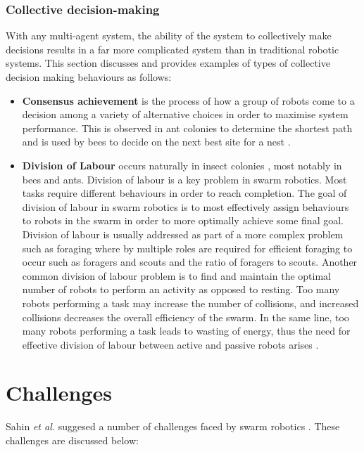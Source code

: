 \subsubsection{Collective decision-making}
With any multi-agent system, the ability of the system to collectively make decisions results in a far more complicated system than in traditional robotic systems. This section discusses and provides examples of types of collective decision making behaviours as follows: 

\begin{itemize}
	\item \textbf{Consensus achievement} is the process of how a group of robots come to a decision among a variety of alternative choices in order to maximise system performance. This is observed in ant colonies to determine the shortest path \cite{bonabeau2001self} and is used by bees to decide on the next best site for a nest \cite{seeley2001nest}.
	
	\item \textbf{Division of Labour} occurs naturally in insect colonies \cite{gautrais2002emergent}, most notably in bees and ants. Division of labour is a key problem in swarm robotics. Most tasks require different behaviours in order to reach completion. The goal of division of labour in swarm robotics is to most effectively assign behaviours to robots in the swarm in order to more optimally achieve some final goal. Division of labour is usually addressed as part of a more complex problem such as foraging where by multiple roles are required for efficient foraging to occur such as foragers and scouts and the ratio of foragers to scouts. Another common division of labour problem is to find and maintain the optimal number of robots to perform an activity as opposed to resting. Too many robots performing a task may increase the number of collisions, and increased collisions decreases the overall efficiency of the swarm. In the same line, too many robots performing a task leads to wasting of energy, thus the need for effective division of labour between active and passive robots arises \cite{jones2003adaptive, krieger2000call}.

\end{itemize}

\section{Challenges}
\label{challenges}

Sahin \textit{et al.} suggesed a number of challenges faced by swarm robotics \cite{csahin2008special}. These challenges are discussed below: 

